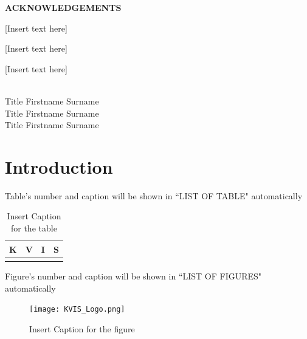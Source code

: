 \documentclass[12pt,a4paper,oneside]{book}
\theoremstyle{plain}
\numberwithin{equation}{chapter} \DeclareMathOperator{\Var}{Var}
\renewcommand{\contentsname}{\hfill\bfseries\Large TABLE OF CONTENTS \hfill}
\begin{document}
\newpage
\begin{center}
	\large{\textbf{ACKNOWLEDGEMENTS}} \\
\end{center}

[Insert text here]

[Insert text here]

[Insert text here]\\\\

\begin{flushright}
    Title Firstname Surname\\
    Title Firstname Surname\\
    Title Firstname Surname\\
\end{flushright}


\newpage

\tableofcontents
%


\newpage
{}
\listoffigures

\newpage
{}
\listoftables


\newpage
{}
\chapter*{Introduction}

\noindent Table's number and caption will be shown in ``LIST OF TABLE" automatically
\begin{table}[H]
	\begin{center}
		\begin{tabular}{ |c|c|c|c|}
			\hline
			K & V & I & S\\
			\hline
				& 	& 	& \\
			\hline
		\end{tabular}
	\end{center}
	\caption{Insert Caption for the table}\label{table1}
\end{table}

\vspace{2cm}

\noindent Figure's number and caption will be shown in ``LIST OF FIGURES" automatically
\begin{figure}[H]
	\texttt{[image: KVIS\_Logo.png]}
	\centering
	\caption{Insert Caption for the figure}\label{fig1}
\end{figure}
\end{document}
